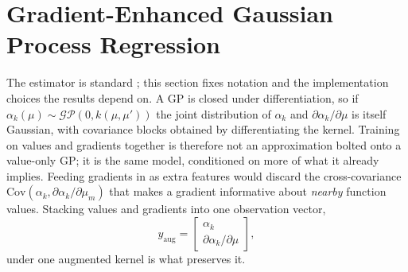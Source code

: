 \documentclass[]{ANStopical}
\begin{document}
\section{Gradient-Enhanced Gaussian Process Regression}\label{sec:gegpr}

The estimator is standard \cite{morris_derivatives,ulaganathan_gek}; this section fixes notation and the implementation choices the results depend on. A GP is closed under differentiation, so if $\alpha_k(\mu)\sim\mathcal{GP}(0,k(\mu,\mu'))$ the joint distribution of $\alpha_k$ and $\partial\alpha_k/\partial\mu$ is itself Gaussian, with covariance blocks obtained by differentiating the kernel. Training on values and gradients together is therefore not an approximation bolted onto a value-only GP; it is the same model, conditioned on more of what it already implies. Feeding gradients in as extra features would discard the cross-covariance $\mathrm{Cov}(\alpha_k,\partial\alpha_k/\partial\mu_m)$ that makes a gradient informative about \emph{nearby} function values. Stacking values and gradients into one observation vector,
\begin{equation}
    y_{\mathrm{aug}} = \begin{bmatrix} \alpha_k \\[2pt] \partial\alpha_k/\partial\mu \end{bmatrix},
    \label{eq:yaug}
\end{equation}
under one augmented kernel is what preserves it.
\end{document}

